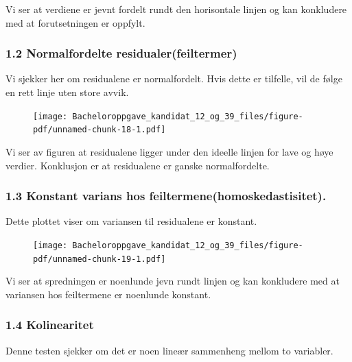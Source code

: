 \documentclass[
  12pt,
  letterpaper,
  DIV=11,
  numbers=noendperiod]{scrartcl}
\begin{document}
Vi ser at verdiene er jevnt fordelt rundt den horisontale linjen og kan
konkludere med at forutsetningen er oppfylt.

\hypertarget{normalfordelte-residualerfeiltermer}{%
\subsubsection{1.2 Normalfordelte
residualer(feiltermer)}\label{normalfordelte-residualerfeiltermer}}

Vi sjekker her om residualene er normalfordelt. Hvis dette er tilfelle,
vil de følge en rett linje uten store avvik.

\begin{figure}[H]

{\centering \texttt{[image: Bacheloroppgave\_kandidat\_12\_og\_39\_files/figure-pdf/unnamed-chunk-18-1.pdf]}

}

\end{figure}

Vi ser av figuren at residualene ligger under den ideelle linjen for
lave og høye verdier. Konklusjon er at residualene er ganske
normalfordelte.

\hypertarget{konstant-varians-hos-feiltermenehomoskedastisitet.}{%
\subsubsection{1.3 Konstant varians hos
feiltermene(homoskedastisitet).}\label{konstant-varians-hos-feiltermenehomoskedastisitet.}}

Dette plottet viser om variansen til residualene er konstant.

\begin{figure}[H]

{\centering \texttt{[image: Bacheloroppgave\_kandidat\_12\_og\_39\_files/figure-pdf/unnamed-chunk-19-1.pdf]}

}

\end{figure}

Vi ser at spredningen er noenlunde jevn rundt linjen og kan konkludere
med at variansen hos feiltermene er noenlunde konstant.

\hypertarget{kolinearitet}{%
\subsubsection{1.4 Kolinearitet}\label{kolinearitet}}

Denne testen sjekker om det er noen lineær sammenheng mellom to
variabler.
\end{document}
